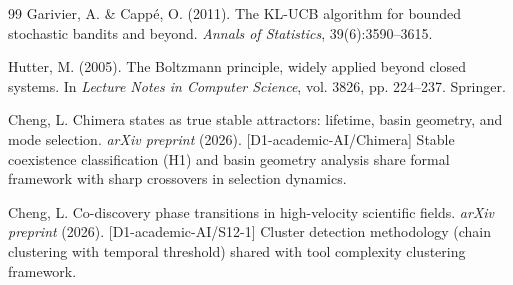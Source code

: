 \documentclass[12pt]{article}
\theoremstyle{definition}
\begin{document}
\begin{thebibliography}{99}
Garivier, A. \& Capp{\'e}, O. (2011).
\newblock The KL-UCB algorithm for bounded stochastic bandits and beyond.
\newblock \emph{Annals of Statistics}, 39(6):3590--3615.

Hutter, M. (2005).
\newblock The Boltzmann principle, widely applied beyond closed systems.
\newblock In \emph{Lecture Notes in Computer Science}, vol. 3826, pp. 224--237. Springer.

Cheng, L. Chimera states as true stable attractors: lifetime, basin geometry, and mode selection.
\textit{arXiv preprint} (2026). [D1-academic-AI/Chimera]
\newblock Stable coexistence classification (H1) and basin geometry analysis share formal framework with sharp crossovers in selection dynamics.

Cheng, L. Co-discovery phase transitions in high-velocity scientific fields.
\textit{arXiv preprint} (2026). [D1-academic-AI/S12-1]
\newblock Cluster detection methodology (chain clustering with temporal threshold) shared with tool complexity clustering framework.

\end{thebibliography}
\end{document}
